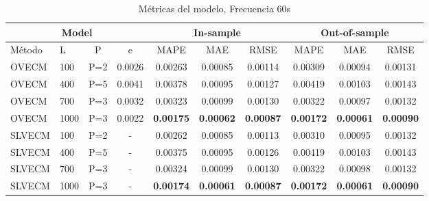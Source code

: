 \begin{table}[ht!]
\caption{Métricas del modelo, Frecuencia 60s}
\label{tab:mapes_60s}
\begin{center}
\begin{adjustbox}{max width=\textwidth}
\begin{tabular}{|l|l|c|c|c|c|c|c|c|c|}
\hline
\multicolumn{4}{|c|}{Model} & \multicolumn{3}{|c|}{In-sample} &
\multicolumn{3}{|c|}{Out-of-sample} \\ 
\hline
\hline
Método & L & P & e &
MAPE & MAE& RMSE&
MAPE & MAE& RMSE \\
\hline
 OVECM  &   100  &  P=2& 0.0026  &  0.00263&  0.00085&  0.00114&  0.00309&  0.00094&  0.00131\\
 OVECM  &   400  &  P=5& 0.0041  &  0.00378&  0.00095&  0.00127&  0.00419&  0.00103&  0.00143\\
 OVECM  &   700  &  P=3& 0.0032  &  0.00323&  0.00099&  0.00130&  0.00322&  0.00097&  0.00132\\
 OVECM  &   1000 &  P=3& 0.0022  &
 \textbf{0.00175}&  \textbf{0.00062}&  \textbf{0.00087} &
 \textbf{0.00172}&  \textbf{0.00061}&  \textbf{0.00090}\\
\hline
 SLVECM  &   100 &  P=2& -  &  0.00262&  0.00085&  0.00113&  0.00310&  0.00095&  0.00132\\
 SLVECM  &   400 &  P=5& -  &  0.00375&  0.00095&  0.00126&  0.00419&  0.00103&  0.00143\\
 SLVECM  &   700 &  P=3& -  &  0.00324&  0.00099&  0.00130&  0.00322&  0.00098&  0.00132\\
 SLVECM  &   1000 &  P=3& -  &
 \textbf{0.00174}&  \textbf{0.00061}&  \textbf{0.00087}&
 \textbf{0.00172}&  \textbf{0.00061}&  \textbf{0.00090}\\
\hline
\end{tabular}
\end{adjustbox}
\end{center}
\end{table}

